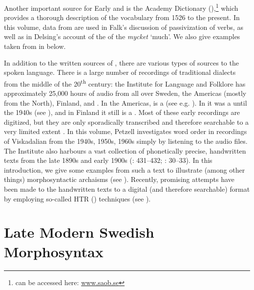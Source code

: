 \documentclass[output=paper]{langscibook}
\begin{document}
Another important source for Early and  is the  Academy Dictionary (),\footnote{ can be accessed here: \href{http://www.saob.se}{{www.saob.se}}} which provides a thorough description of the  vocabulary from 1526 to the present. In this volume, data from  are used in Falk’s discussion of passivization of  verbs, as well as in Delsing’s account of the  of the  \textit{mycket} ‘much’. We also give examples taken from  in  below.



In addition to the written sources of , there are various types of sources to the spoken language. There is a large number of recordings of traditional dialects from the middle of the 20\textsuperscript{th} century: the Institute for Language and Folklore has approximately 25,000 hours of  audio from all over Sweden, the Americas (mostly from the North), Finland, and . In the Americas,  is a  (see e.g. \citealt{Larsson2015}). In  it was a  until the 1940s (see \citealt{Rosenkvist2018}), and in Finland it still is a . Most of these early recordings are digitized, but they are only sporadically transcribed and therefore searchable to a very limited extent \citep{BergEtAl2019}. In this volume, Petzell investigates word order in recordings of Viskadalian  from the 1940s, 1950s, 1960s simply by listening to the audio files. The Institute also harbours a vast collection of phonetically precise, handwritten  texts from the late 1890s and early 1900s (\citealt{Sellberg1993}: 431–432; \citealt{SOU1924/27}: 30–33). In this introduction, we give some examples from such a  text to illustrate (among other things) morphosyntactic archaisms (see ). Recently, promising attempts have been made to  the handwritten texts to a digital (and therefore searchable) format by employing so-called HTR () techniques (see \citealt{Petzell2019,Petzell2020}).


\section{Late Modern Swedish Morphosyntax}\label{sec:intro:3}
\end{document}
